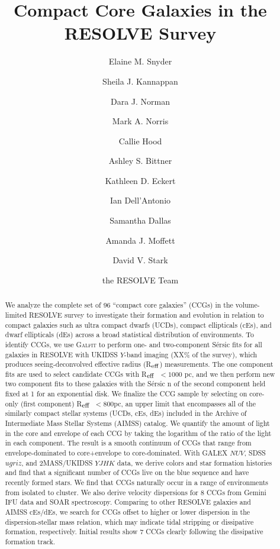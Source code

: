 \documentclass[iop,apj]{emulateapj}
\newcommand{\Reff}{R$_{\rm eff}$}
\begin{document}
\title{Compact Core Galaxies in the RESOLVE Survey}
\author{Elaine M. Snyder}
\author{Sheila J. Kannappan}
\author{Dara J. Norman}
\author{Mark A. Norris}
\author{Callie Hood}
\author{Ashley S. Bittner}
\author{Kathleen D. Eckert}
\author{Ian Dell'Antonio}
\author{Samantha Dallas}
\author{Amanda J. Moffett}
\author{David V. Stark}
\author{the RESOLVE Team}
\begin{abstract}
We analyze the complete set of 96 ``compact core galaxies'' (CCGs) in the volume-limited RESOLVE survey to investigate their formation and evolution in relation to compact galaxies such as ultra compact dwarfs (UCDs), compact ellipticals (cEs), and dwarf ellipticals (dEs) across a broad statistical distribution of environments. To identify CCGs, we use \textsc{Galfit} to perform one- and two-component S\'ersic fits for all galaxies in RESOLVE with UKIDSS $Y$-band imaging (XX\% of the survey), which produces seeing-deconvolved effective radius (\Reff) measurements. The one component fits are used to select candidate CCGs with \Reff\ $< 1000$ pc, and we then perform new two component fits to these galaxies with the S\'ersic n of the second component held fixed at 1 for an exponential disk. We finalize the CCG sample by selecting on core-only (first component) \Reff\ $<800$pc, an upper limit that encompasses all of the similarly compact stellar systems (UCDs, cEs, dEs) included in the Archive of Intermediate Mass Stellar Systems (AIMSS) catalog. We quantify the amount of light in the core and envelope of each CCG by taking the logarithm of the ratio of the light in each component. The result is a smooth continuum of CCGs that range from envelope-dominated to core+envelope to core-dominated. With GALEX $NUV$, SDSS $ugriz$, and 2MASS/UKIDSS $YJHK$ data, we derive colors and star formation histories and find that a significant number of CCGs live on the blue sequence and have recently formed stars. We find that CCGs naturally occur in a range of environments from isolated to cluster. We also derive velocity dispersions for 8 CCGs from Gemini IFU data and SOAR spectroscopy. Comparing to other RESOLVE galaxies and AIMSS cEs/dEs, we search for CCGs offset to higher or lower dispersion in the dispersion-stellar mass relation, which may indicate tidal stripping or dissipative formation, respectively. Initial results show 7 CCGs clearly following the dissipative formation track.
\end{abstract}
\end{document}
